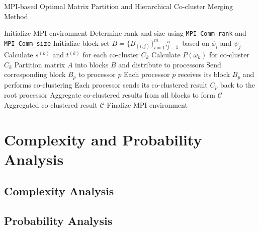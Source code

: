 \documentclass[journal]{IEEEtran}
\begin{document}
\begin{algorithm}[!t]
  \caption{MPI-based Optimal Matrix Partition and Hierarchical Co-cluster Merging Method}\label{alg:mpi_method}
  \begin{algorithmic}[1]
    \STATE Initialize MPI environment
    \STATE Determine rank and size using \texttt{MPI\_Comm\_rank} and \texttt{MPI\_Comm\_size}
      \STATE Initialize block set $B = \{B_{(i,j)}\}_{i=1}^m,_{j=1}^n$ based on $\phi_i$ and $\psi_j$
      \STATE Calculate $s^{(k)}$ and $t^{(k)}$ for each co-cluster $C_k$
        \STATE Calculate $P(\omega_k)$ for co-cluster $C_k$
          \STATE Partition matrix $A$ into blocks $B$ and distribute to processors
            \STATE Send corresponding block $B_p$ to processor $p$
          \ENDFOR
        \ENDIF
      \ENDFOR
    \ENDIF
    \STATE Each processor $p$ receives its block $B_p$ and performs co-clustering
    \STATE Each processor sends its co-clustered result $C_p$ back to the root processor
      \STATE Aggregate co-clustered results from all blocks to form $\mathcal{C}$
      \RETURN Aggregated co-clustered result $\mathcal{C}$
    \ENDIF
    \STATE Finalize MPI environment
  \end{algorithmic}
\end{algorithm}

\section{Complexity and Probability Analysis}
\label{sec:analysis}

\subsection{Complexity Analysis}
\label{subsec:complexity}

\subsection{Probability Analysis}
\end{document}

